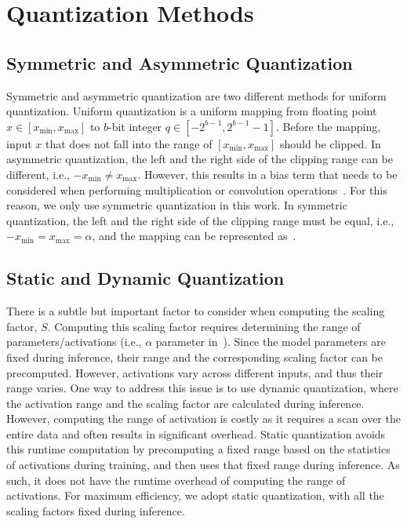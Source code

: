\appendix

\section{Quantization Methods}
\label{appendix:quantization_methods}
\subsection{Symmetric and Asymmetric Quantization}
Symmetric and asymmetric quantization are two different methods for uniform quantization. 
Uniform quantization is a uniform mapping from floating point $x \in [x_{\mathrm{min}}, x_{\mathrm{max}}]$ to $b$-bit integer $q \in [-2^{b-1}, 2^{b-1} - 1]$.
Before the mapping, input $x$ that does not fall into the range of $[x_{\mathrm{min}}, x_{\mathrm{max}}]$  should be clipped.
In asymmetric quantization, the left and the right side of the clipping range can be different, i.e., $-x_{\mathrm{min}} \ne x_{\mathrm{max}}$.
However, this results in a bias term that needs to be considered when performing multiplication or convolution operations~\cite{jacob2018quantization}.
For this reason, we only use symmetric quantization in this work. 
In symmetric quantization, the left and the right side of the clipping range must be equal, i.e., $-x_{\mathrm{min}} = x_{\mathrm{max}} = \alpha$, 
and the mapping can be represented as~.


\subsection{Static and Dynamic Quantization}
There is a subtle but important factor to consider when computing the scaling factor, $S$.
Computing this scaling factor requires determining the range of parameters/activations (i.e., $\alpha$ parameter in~).
Since the model parameters are fixed during inference, their range and the corresponding scaling factor can be precomputed.
However, activations vary across different inputs, and thus their range varies. 
One way to address this issue is to use dynamic quantization, where the activation range and the scaling factor are calculated during inference.
However, computing the range of activation is costly as it requires a scan over the entire data and often results in significant overhead.
Static quantization avoids this runtime computation by precomputing a fixed range based on the statistics of activations during training, and then uses that fixed range during inference. 
As such, it does not have the runtime overhead of computing the range of activations. 
For maximum efficiency, we adopt static quantization, with all the scaling factors fixed during inference.


